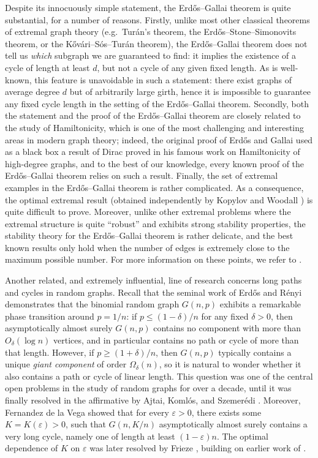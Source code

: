 \documentclass[10pt]{article}
\theoremstyle{definition}
\let\leq\leqslant
\let\geq\geqslant
\begin{document}
Despite its innocuously simple statement, the Erd\H os--Gallai theorem is quite substantial, for a number of reasons. Firstly, unlike most other classical theorems of extremal graph theory (e.g.\ Tur\'an's theorem, the Erd\H os--Stone--Simonovits theorem, or the K\H ov\'ari--S\'os--Tur\'an theorem), the Erd\H os--Gallai theorem does not tell us \emph{which} subgraph we are guaranteed to find: it implies the existence of a cycle of length at least $d$, but not a cycle of any given fixed length. As is well-known, this feature is unavoidable in such a statement: there exist graphs of average degree $d$ but of arbitrarily large girth, hence it is impossible to guarantee any fixed cycle length in the setting of the Erd\H os--Gallai theorem.  
Secondly, both the statement and the proof of the Erd\H os--Gallai theorem are closely related to the study of Hamiltonicity, which is one of the most challenging and interesting areas in modern graph theory; indeed, the original proof of Erd\H os and Gallai used as a black box a result of Dirac \cite[Theorem 4]{MR47308} proved in his famous work on Hamiltonicity of high-degree graphs, and to the best of our knowledge, every known proof of the Erd\H os--Gallai theorem relies on such a result. Finally, the set of extremal examples in the Erd\H os--Gallai theorem is rather complicated. As a consequence, the optimal extremal result (obtained independently by Kopylov \cite{MR463030} and Woodall \cite{MR427143}) is quite difficult to prove. Moreover, unlike other extremal problems where the extremal structure is quite ``robust'' and exhibits strong stability properties, the stability theory for the Erd\H os--Gallai theorem is rather delicate, and the best known results \cite{MR3777040,MR3548292,MR4078813} only hold when the number of edges is extremely close to the maximum possible number. For more information on these points, we refer to \cite[Section 5]{MR3203598}.

Another related, and extremely influential, line of research concerns long paths and cycles in random graphs. Recall that the seminal work of Erd\H os and R\'enyi \cite{MR125031} demonstrates that the binomial random graph $G(n,p)$ exhibits a remarkable phase transition around $p=1/n$: if $p\leq (1-\delta)/n$ for any fixed $\delta>0$, then asymptotically almost surely $G(n,p)$ contains no component with more than $O_\delta (\log n)$ vertices, and in particular contains no path or cycle of more than that length. However, if $p \geq (1+\delta)/n$, then $G(n,p)$ typically contains a unique \emph{giant component} of order $\Omega_\delta(n)$, so it is natural to wonder whether it also contains a path or cycle of linear length. This question was one of the central open problems in the study of random graphs for over a decade, until it was finally resolved in the affirmative by Ajtai, Koml\'os, and Szemer\'edi \cite{MR602411}. Moreover, Fernandez de la Vega \cite{MR685900} showed that for every $\varepsilon>0$, there exists some $K=K(\varepsilon)>0$, such that $G(n,K/n)$ asymptotically almost surely contains a very long cycle, namely one of length at least $(1-\varepsilon)n$. The optimal dependence of $K$ on $\varepsilon$ was later resolved by Frieze \cite{MR842277}, building on earlier work of \cite{bollobas1984long,MR698649}.
\end{document}
